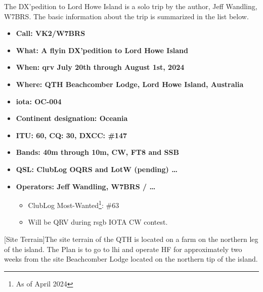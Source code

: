\documentclass[11pt]{article}
\begin{document}
The DX'pedition to Lord Howe Island is a solo trip by the author, Jeff
Wandling, W7BRS.  The basic information about the trip is summarized
in the list below.

\begin{itemize}
\item {\textbf{Call: VK2/W7BRS}}
\item {\textbf{What: A {\gls{flyin}} DX'pedition to Lord Howe Island}}
\item {\textbf{When: {\gls{qrv}} July 20th through August 1st, 2024}}
\item {\textbf{Where: QTH Beachcomber Lodge, Lord Howe Island, Australia}}
\item {\textbf{{\gls{iota}}: OC-004}}
\item {\textbf{Continent designation: Oceania}}
\item {\textbf{ITU: 60, CQ: 30, DXCC: \#147}}
\item {\textbf{Bands: 40m through 10m, CW, FT8 and SSB}}
\item {\textbf{QSL: ClubLog OQRS and LotW (pending)  \ldots}}
\item {\textbf{Operators: Jeff Wandling, W7BRS /  \ldots}}
\begin{itemize}
    \item ClubLog Most-Wanted\footnote{As of April 2024}: \#63
    \item Will be QRV during {\gls{rsgb}} IOTA CW contest.
\end{itemize}
\end{itemize}
\par

\vskip2mm
\noindent%
\begin{minipage}{\linewidth}%
\captionsetup{width=0.8\linewidth}
[Site Terrain]{The site terrain of the QTH is located
on a farm on the northern leg of the island.
The Plan is to go to {\gls{lhi}} and operate HF for approximately
two weeks from the site Beachcomber Lodge located on the northern
tip of the island.}
\label{farm}
\end{minipage}
\newpage
\vskip4mm
\end{document}
